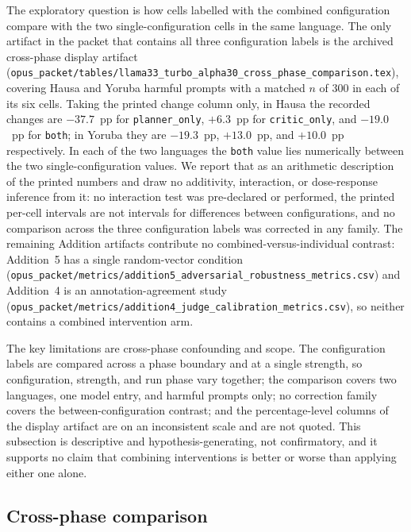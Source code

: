 The exploratory question is how cells labelled with the combined configuration
compare with the two single-configuration cells in the same language. The only
artifact in the packet that contains all three configuration labels is the
archived cross-phase display artifact
(\texttt{opus\_packet/tables/llama33\_turbo\_alpha30\_cross\_phase\_comparison.tex}),
covering Hausa and Yoruba harmful prompts with a matched $n$ of 300 in each of
its six cells. Taking the printed change column only, in Hausa the recorded
changes are $-37.7$~pp for \texttt{planner\_only}, $+6.3$~pp for
\texttt{critic\_only}, and $-19.0$~pp for \texttt{both}; in Yoruba they are
$-19.3$~pp, $+13.0$~pp, and $+10.0$~pp respectively. In each of the two
languages the \texttt{both} value lies numerically between the two
single-configuration values. We report that as an arithmetic description of the
printed numbers and draw no additivity, interaction, or dose-response inference
from it: no interaction test was pre-declared or performed, the printed
per-cell intervals are not intervals for differences between configurations, and
no comparison across the three configuration labels was corrected in any
family. The remaining Addition artifacts contribute no combined-versus-individual
contrast: Addition~5 has a single random-vector condition
(\texttt{opus\_packet/metrics/addition5\_adversarial\_robustness\_metrics.csv})
and Addition~4 is an annotation-agreement study
(\texttt{opus\_packet/metrics/addition4\_judge\_calibration\_metrics.csv}), so
neither contains a combined intervention arm.

The key limitations are cross-phase confounding and scope. The configuration
labels are compared across a phase boundary and at a single strength, so
configuration, strength, and run phase vary together; the comparison covers two
languages, one model entry, and harmful prompts only; no correction family
covers the between-configuration contrast; and the percentage-level columns of
the display artifact are on an inconsistent scale and are not quoted. This
subsection is descriptive and hypothesis-generating, not confirmatory, and it
supports no claim that combining interventions is better or worse than applying
either one alone.

\subsection{Cross-phase comparison}


